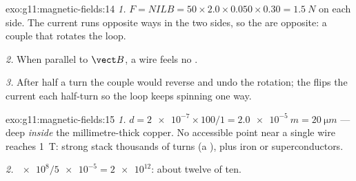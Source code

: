 \begin{solution}{exo:g11:magnetic-fields:14}
\emph{1.} $F = NILB = 50 \times 2.0 \times 0.050 \times 0.30 =
\qty{1.5}{N}$ on each side. The current runs opposite ways in the two
sides, so the  are opposite: a couple that rotates the loop.

\emph{2.} When parallel to $\vect B$, a wire feels no .

\emph{3.} After half a turn the couple would reverse and undo the
rotation; the  flips the current each half-turn so the loop
keeps spinning one way.
\end{solution}

\begin{solution}{exo:g11:magnetic-fields:15}
\emph{1.} $d = \num{2e-7} \times 100 / 1 = \qty{2.0e-5}{m} =
\qty{20}{\micro m}$ --- deep \emph{inside} the millimetre-thick copper.
No accessible point near a single wire reaches \qty{1}{T}: strong
 stack thousands of turns (a ), plus iron or
superconductors.

\emph{2.} $\num{e8} / \num{5e-5} = \num{2e12}$: about twelve  of
ten.
\end{solution}

